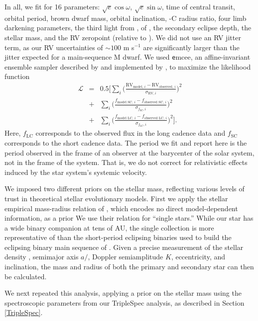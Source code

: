 In all, we fit for 16 parameters: $\sqrt{e}\cos\omega$, $\sqrt{e}\sin\omega$, time of central transit, orbital period, brown dwarf mass, orbital inclination, \LA-C radius ratio, four limb darkening parameters, the third light from \LB, \logg{} of \LA, the secondary eclipse depth, the stellar mass, and the RV zeropoint (relative to \LB). We did not use an RV jitter term, as our RV uncertainties of $\sim 100$ m s$^{-1}$ are significantly larger than the jitter expected for a main-sequence M dwarf. We used {\texttt emcee}, an affine-invariant ensemble sampler described by \citet{Goodman10} and implemented by \citet{Foreman-Mackey12}, to maximize the likelihood function
\begin{eqnarray}
\mathcal{L} &=& 0.5 \bigg[\sum_i \bigg(\frac{\textrm{RV$_{\textrm{model, $i$}}$} - \textrm{RV$_{\textrm{observed, $i$}}$}}{\sigma_{\textrm{RV}, i}}\bigg)^2 \nonumber \\
&+& \sum_i
 \bigg(\frac{f_{\textrm{model SC, $i$}} - f_{\textrm{observed SC, $i$}}}{\sigma_{f _\textrm{SC}, i}}\bigg)^2 \nonumber \\
 &+& \sum_i
 \bigg(\frac{f_{\textrm{model LC, $i$}} - f_{\textrm{observed LC, $i$}}}{\sigma_{f _\textrm{LC}, i}}\bigg)^2\bigg].
\end{eqnarray}
Here, $f_\textrm{LC}$ corresponds to the observed flux in the \itk{} long cadence data and $f_\textrm{SC}$ corresponds to the short cadence data.
The period we fit and report here is the period observed in the frame of an observer at the barycenter of the solar system, not in the frame of the \LHS{} system.
That is, we do not correct for relativistic effects induced by the star system's systemic velocity.

We imposed two different priors on the stellar mass, reflecting various levels of trust in theoretical stellar evolutionary models. 
First we apply the stellar empirical mass-radius relation of \citet{Boyajian12}, which encodes no direct model-dependent information, as a prior
We use their relation for ``single stars.''
While our star has a wide binary companion at tens of AU, the single collection is more representative of \LA{} than the short-period eclipsing binaries used to build the eclipsing binary main sequence of \citet{Boyajian12}.
Given a precise measurement of the stellar density \rhostar, semimajor axis $a/$\rstar, Doppler semiamplitude $K$, eccentricity, and inclination, the mass and radius of both the primary and secondary star can then be calculated.


We next repeated this analysis, applying a prior on the stellar mass using the spectroscopic parameters from our TripleSpec analysis, as described in Section {\ref{TripleSpec}}.



